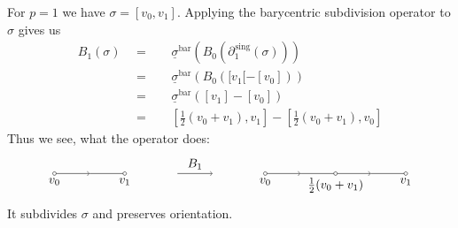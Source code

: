 \documentclass[11pt]{book}
\numberwithin{dummy}{section}
\theoremstyle{nonumberbreak}
\newenvironment{ex}[1][]{\ifthenelse{\equal{#1}{}}{\example}{\example[#1]}\rm}{\endexample}
\begin{document}
\begin{spacing}{1.4}
\begin{ex}
For $p=1$ we have $\sigma=[v_0, v_1]$.
Applying the barycentric subdivision operator to $\sigma$ gives us
\begin{alignat*}{5}
B_1(\sigma) \ \ &=&& \ \ \underline{\sigma}^{\mathrm{bar}} \left( B_0( \partial_1^{\hspace{1pt}\mathrm{sing}} ( \sigma))\right) \\
&=&& \ \ \underline{\sigma}^{\mathrm{bar}} \left( B_0([v_1[-[v_0])\right) \\
&=&& \ \ \underline{\sigma}^{\mathrm{bar}} \left( [v_1]-[v_0] \right) \\
&=&& \ \ \left[ \frac{1}{2} (v_0+v_1), v_1\right] - \left[ \frac{1}{2} (v_0+v_1), v_0\right]
\end{alignat*}
Thus we see, what the operator does:
$$
\begin{tikzpicture}
\draw (0,0) -- (0.95,0);
\draw[->] (-0.95,0) -- (0,0);
\draw (-0.95,0) arc(0:360:0.05);
\draw (1.05,0) arc(0:360:0.05);
\draw (1,0) node[below] {$v_1$};
\draw (-1,0) node[below] {$v_0$};
\draw[->] (5.05,0) -- (6,0);
\draw (6,0) -- (6.95,0);
\draw[->] (7.05,0) -- (8,0);
\draw (8,0) -- (8.95,0);
\draw (5.05,0) arc(0:360:0.05);
\draw (7.05,0) arc(0:360:0.05);
\draw (9.05,0) arc(0:360:0.05);
\draw (5,0) node[below] {$v_0$};
\draw (9,0) node[below] {$v_1$};
\draw (7,0) node[below] {$\frac{1}{2} (v_0+v_1)$};

\draw[->] (2.5,0) -- (3.5,0);
\draw (3,0) node[above] {$B_1$};

\end{tikzpicture}
$$
It subdivides $\sigma$ and preserves orientation.

\end{ex}



\end{spacing}
\end{document}
